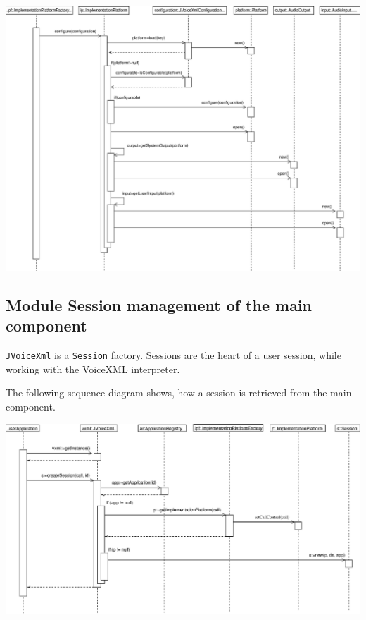\documentclass[11pt,a4paper]{article}
\begin{document}
\begin{center}
\includegraphics[scale=0.35]{seq-implementation.eps}
\end{center}

\subsection{Module Session management of the main component}

\texttt{JVoiceXml} is a \texttt{Session} factory\cite{gamma:design_patterns}. 
Sessions are the heart of a user session, while working with the VoiceXML 
interpreter.

The following sequence diagram shows, how a session is retrieved
from the main component.

\begin{center}
\includegraphics[scale=0.4]{seq-jvoicexml-sessionfactory.eps}
\end{center}
\end{document}
